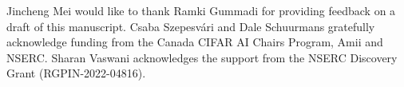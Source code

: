 \begin{ack}
Jincheng Mei would like to thank Ramki Gummadi for providing feedback on a draft of this manuscript.
Csaba Szepesv\'ari and Dale Schuurmans gratefully acknowledge funding from 
the Canada CIFAR AI Chairs Program, Amii and NSERC. Sharan Vaswani acknowledges the support from the NSERC Discovery Grant (RGPIN-2022-04816). 
\end{ack}